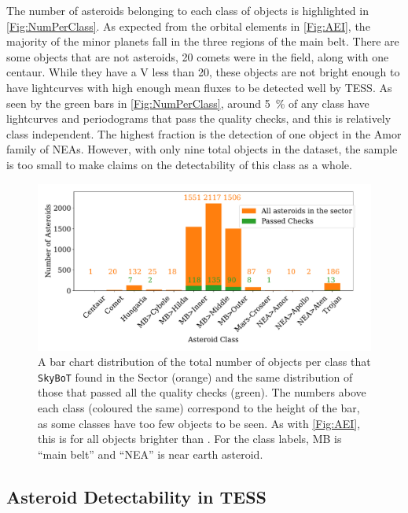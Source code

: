 \documentclass{UCreport}
\begin{document}
The number of asteroids belonging to each class of objects is highlighted in \autoref{Fig:NumPerClass}.
As expected from the orbital elements in \autoref{Fig:AEI}, the majority of the minor planets fall in the three regions of the main belt.
There are some objects that are not asteroids, 20 comets were in the field, along with one centaur.
While they have a V \unit{\mag} less than 20, these objects are not bright enough to have lightcurves with high enough mean fluxes to be detected well by TESS. 
As seen by the green bars in \autoref{Fig:NumPerClass}, around \qty{5}{\percent} of any class have lightcurves and periodograms that pass the quality checks, and this is relatively class independent.
The highest fraction is the detection of one object in the Amor family of NEAs.
However, with only nine total objects in the dataset, the sample is too small to make claims on the detectability of this class as a whole.

\begin{figure}
  \centering
  \includegraphics[width=\textwidth]{./Figures/classesBarqualCut.pdf}
  \caption[Asteroid Class Distribution]{A bar chart distribution of the total number of objects per class that \texttt{SkyBoT} found in the Sector (orange) and the same distribution of those that passed all the quality checks (green).
    The numbers above each class (coloured the same) correspond to the height of the bar, as some classes have too few objects to be seen.
    As with \autoref{Fig:AEI}, this is for all objects brighter than \unit{\mag}.
    For the class labels, MB is ``main belt'' and ``NEA'' is near earth asteroid.}
  \label{Fig:NumPerClass}
\end{figure}

\subsection{Asteroid Detectability in TESS} \label{SubSec:Detect}
\end{document}
